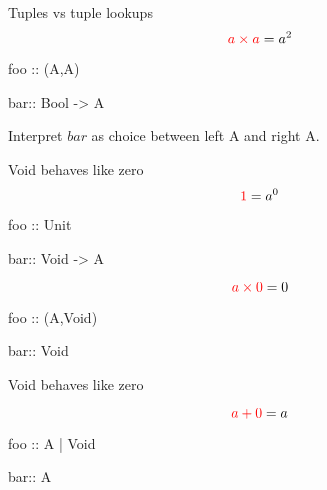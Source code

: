 \documentclass{beamer}
\begin{document}
\begin{frame}[fragile]
Tuples vs tuple lookups\\
$$\textcolor{red}{a \times a} = a^2$$

\color{red}
\begin{code}
foo :: (A,A)
\end{code}
\color{black}
\begin{code}
bar:: Bool -> A
\end{code}
Interpret $bar$ as choice between left A and right A.

\end{frame}









\begin{frame}[fragile]
Void behaves like zero
$$\textcolor{red}{1}= a^{0}$$
\color{red}
\begin{code}
foo :: Unit
\end{code}
\color{black}
\begin{code}
bar:: Void -> A
\end{code}
$$\textcolor{red}{a\times0} = 0$$
\color{red}
\begin{code}
foo :: (A,Void)
\end{code}
\color{black}
\begin{code}
bar:: Void
\end{code}

\end{frame}

\begin{frame}[fragile]
Void behaves like zero

$$\textcolor{red}{a+0} = a$$
\color{red}
\begin{code}
foo :: A | Void
\end{code}
\color{black}
\begin{code}
bar:: A
\end{code}
\end{frame}
\end{document}
